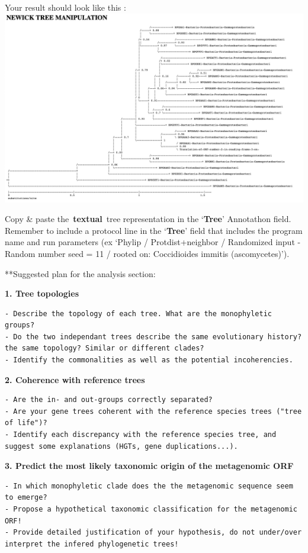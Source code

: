 \documentclass[
]{book}
\begin{document}
Your result should look like this :
\includegraphics{figures/Annotathon/Annot_newick_example.png}

Copy \& paste the~\textbf{textual}~tree representation in the `\textbf{Tree}' Annotathon field. Remember to include a protocol line in the `\textbf{Tree}' field that includes the program name and run parameters (ex `Phylip / Protdist+neighbor / Randomized input - Random number seed = 11 / rooted on: Coccidioides immitis (ascomycetes)').

**Suggested plan for the analysis section:

\textbf{1. Tree topologies}

\begin{verbatim}
- Describe the topology of each tree. What are the monophyletic groups?
- Do the two independant trees describe the same evolutionary history? the same topology? Similar or different clades? 
- Identify the commonalities as well as the potential incoherencies.
\end{verbatim}

\textbf{2. Coherence with reference trees}

\begin{verbatim}
- Are the in- and out-groups correctly separated?
- Are your gene trees coherent with the reference species trees ("tree of life")? 
- Identify each discrepancy with the reference species tree, and suggest some explanations (HGTs, gene duplications...).
\end{verbatim}

\textbf{3. Predict the most likely taxonomic origin of the metagenomic ORF}

\begin{verbatim}
- In which monophyletic clade does the the metagenomic sequence seem to emerge?
- Propose a hypothetical taxonomic classification for the metagenomic ORF!
- Provide detailed justification of your hypothesis, do not under/over interpret the infered phylogenetic trees!
\end{verbatim}
\end{document}
